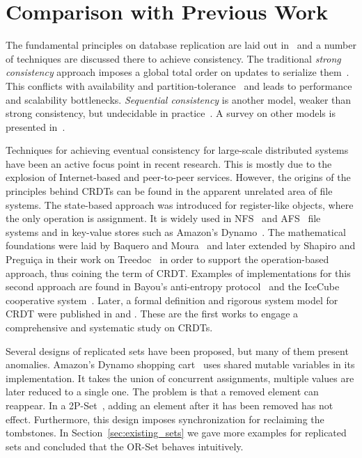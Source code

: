 \section{Comparison with Previous Work}
\label{sec:previous_work}

The fundamental principles on database replication are laid out
in~\cite{lindsay} and a number of techniques are discussed there to achieve
consistency. The traditional \textit{strong consistency} approach imposes a
global total order on updates to serialize
them~\cite{Lamport:1978:TCO:359545.359563}. This conflicts with availability and
partition-tolerance~\cite{Gilbert:2002:BCF:564585.564601} and leads to
performance and scalability bottlenecks. \textit{Sequential consistency} is
another model, weaker than strong consistency, but undecidable in
practice~\cite{Qadeer:2003:VSC:939835.940001}. A survey on other models is
presented in~\cite{Mosberger:1993:MCM:160551.160553}.

Techniques for achieving eventual consistency for large-scale distributed
systems have been an active focus point in recent research. This is mostly due
to the explosion of Internet-based and peer-to-peer services. However, the
origins of the principles behind CRDTs can be found in the apparent unrelated
area of file systems. The state-based approach was introduced for register-like
objects, where the only operation is assignment. It is widely used in
NFS~\cite{Sandberg85designand} and AFS~\cite{Howard:1988:SPD:35037.35059} file
systems and in key-value stores such as Amazon's
Dynamo~\cite{DeCandia:2007:DAH:1294261.1294281}. The mathematical foundations
were laid by Baquero and Moura~\cite{scadt4} and later extended by Shapiro and
Pregui\c{c}a in their work on Treedoc~\cite{Preguica:2009:CRD:1584339.1584604}
in order to support the operation-based approach, thus coining the term of CRDT.
Examples of implementations for this second approach are found in Bayou's
anti-entropy protocol~\cite{Petersen:1997:FUP:268998.266711} and the IceCube
cooperative system~\cite{preguica:inria-00445758}. Later, a formal definition
and rigorous system model for CRDT were published in
\cite{shapiro:inria-00555588} and \cite{Shapiro:2011:CRD:2050613.2050642}.
These are the first works to engage a comprehensive and systematic study on
CRDTs.

Several designs of replicated sets have been proposed, but many of them present
anomalies. Amazon's Dynamo shopping
cart~\cite{DeCandia:2007:DAH:1294261.1294281} uses shared mutable variables in
its implementation. It takes the union of concurrent assignments, multiple values
are later reduced to a single one. The problem is that a removed element can
reappear. In a 2P-Set~\cite{Wuu:1984:ESR:800222.806750}, adding an element after
it has been removed has not effect. Furthermore, this design imposes
synchronization for reclaiming the tombstones. In
Section~\ref{sec:existing_sets} we gave more examples for replicated sets and
concluded that the OR-Set behaves intuitively.
